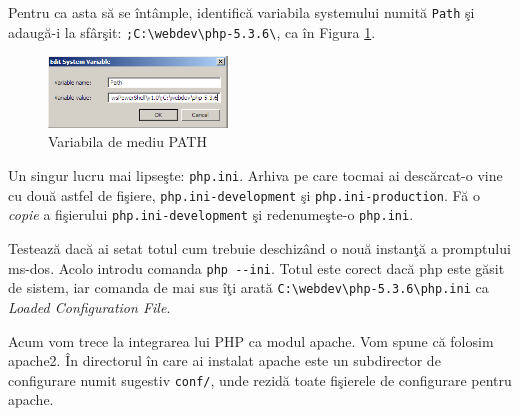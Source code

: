 Pentru ca asta să
se întâmple, identifică
variabila systemului numită \texttt{Path}
şi adaugă-i la sfârşit:
\texttt{;C:{\textbackslash}webdev{\textbackslash}php-5.3.6{\textbackslash}}, ca în
Figura \ref{img:win env path}.
\begin{figure}[ht!]
  \centering
    \includegraphics[width=180px]{cap01/Screenshot-21.png}
  \caption{Variabila de mediu PATH}
  \label{img:win env path}
\end{figure}


Un singur lucru mai lipseşte: \texttt{php.ini}. Arhiva pe care tocmai
ai descărcat-o vine cu două astfel de fişiere, \texttt{php.ini-development} şi
\texttt{php.ini-production}. Fă o \textit{copie} a fişierului
\texttt{php.ini-development} şi redenumeşte-o \texttt{php.ini}.

Testează dacă ai setat totul cum trebuie deschizând o nouă instanţă
a promptului ms-dos.
Acolo introdu comanda \texttt{php -{}-ini}.
Totul este corect dacă php este găsit de sistem, iar comanda de mai sus îţi
arată \texttt{C:{\textbackslash}webdev{\textbackslash}php-5.3.6{\textbackslash}php.ini}
ca \textit{Loaded Configuration File}.


\vspace{1em}

Acum vom trece la integrarea lui PHP ca modul apache. Vom spune că folosim
apache2. În directorul în care ai instalat apache este un subdirector de configurare
numit sugestiv \texttt{conf/}, unde rezidă toate fişierele de configurare
pentru apache.

